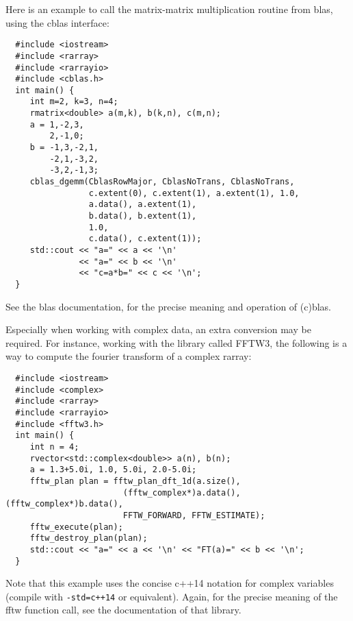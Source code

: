 \documentclass[11pt,twoside]{article}
\begin{document}
Here is an example to call the matrix-matrix multiplication routine
from blas, using the cblas interface:
\vspace{-5pt}\begin{framed}\vspace{-14pt}%
\begin{verbatim}
  #include <iostream>
  #include <rarray>
  #include <rarrayio>
  #include <cblas.h>
  int main() {
     int m=2, k=3, n=4;
     rmatrix<double> a(m,k), b(k,n), c(m,n);
     a = 1,-2,3,
         2,-1,0;
     b = -1,3,-2,1,
         -2,1,-3,2,
         -3,2,-1,3;
     cblas_dgemm(CblasRowMajor, CblasNoTrans, CblasNoTrans,
                 c.extent(0), c.extent(1), a.extent(1), 1.0,
                 a.data(), a.extent(1),
                 b.data(), b.extent(1),
                 1.0,
                 c.data(), c.extent(1));
     std::cout << "a=" << a << '\n'
               << "a=" << b << '\n' 
               << "c=a*b=" << c << '\n';
  }
\end{verbatim}%
\vspace{-14pt}\end{framed}\vspace{-8pt}
\noindent
See the blas documentation, for the precise meaning and operation of
(c)blas.

Especially when working with complex data, an extra conversion may be
required. For instance, working with the library called FFTW3, the
following is a way to compute the fourier transform of a complex
rarray:
\vspace{-5pt}\begin{framed}\vspace{-14pt}%
\begin{verbatim}
  #include <iostream>
  #include <complex>
  #include <rarray>
  #include <rarrayio>
  #include <fftw3.h>
  int main() {
     int n = 4;
     rvector<std::complex<double>> a(n), b(n);
     a = 1.3+5.0i, 1.0, 5.0i, 2.0-5.0i;
     fftw_plan plan = fftw_plan_dft_1d(a.size(),
                        (fftw_complex*)a.data(), (fftw_complex*)b.data(), 
                        FFTW_FORWARD, FFTW_ESTIMATE);
     fftw_execute(plan);
     fftw_destroy_plan(plan);
     std::cout << "a=" << a << '\n' << "FT(a)=" << b << '\n';
  }
\end{verbatim}%
\vspace{-14pt}\end{framed}\vspace{-8pt}
\noindent
Note that this example uses the concise c++14 notation for complex
variables (compile with \texttt{-std=c++14} or equivalent). Again, for the precise meaning of the fftw function call, see the documentation of
that library.
\end{document}
